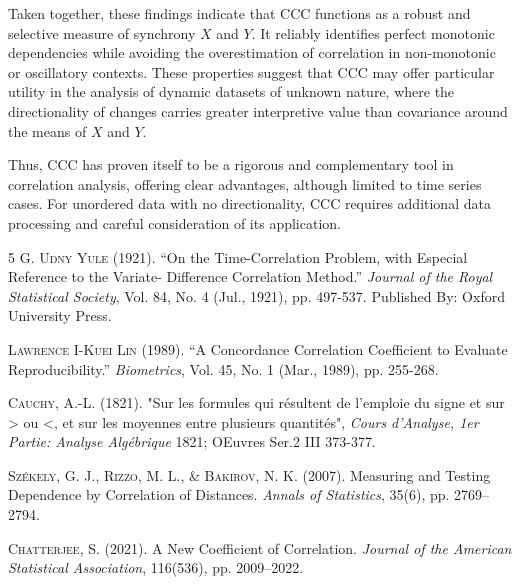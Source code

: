 \documentclass[aos]{imsart}
\begin{document}
Taken together, these findings indicate that CCC functions as a robust and selective measure of synchrony $X$ and $Y$. It reliably identifies perfect monotonic dependencies while avoiding the overestimation of correlation in non-monotonic or oscillatory contexts. These properties suggest that CCC may offer particular utility in the analysis of dynamic datasets of unknown nature, where the directionality of changes carries greater interpretive value than covariance around the means of $X$ and $Y$.

Thus, CCC has proven itself to be a rigorous and complementary tool in correlation analysis, offering clear advantages, although limited to time series cases. For unordered data with no directionality, CCC requires additional data processing and careful consideration of its application.


\begin{thebibliography}{5}
\textsc{G. Udny Yule} (1921). “On the Time-Correlation Problem, with Especial Reference to the Variate- Difference Correlation Method.” \textit{Journal of the Royal Statistical Society}, Vol. 84, No. 4 (Jul., 1921), pp. 497-537. Published By: Oxford University Press.

\textsc{Lawrence I-Kuei Lin} (1989). “A Concordance Correlation Coefficient to Evaluate Reproducibility.” \textit{Biometrics}, Vol. 45, No. 1 (Mar., 1989), pp. 255-268.

\textsc{Cauchy, A.-L.} (1821). "Sur les formules qui résultent de l'emploie du signe et sur > ou <, et sur les moyennes entre plusieurs quantités", \textit{Cours d'Analyse, 1er Partie: Analyse Algébrique} 1821; OEuvres Ser.2 III 373-377.

\textsc{Székely, G. J., Rizzo, M. L., \& Bakirov, N. K.} (2007). Measuring and Testing Dependence by Correlation of Distances. \textit{Annals of Statistics}, 35(6), pp. 2769–2794.

\textsc{Chatterjee, S.} (2021). A New Coefficient of Correlation. \textit{Journal of the American Statistical Association}, 116(536), pp. 2009–2022.
\end{thebibliography}
\end{document}

